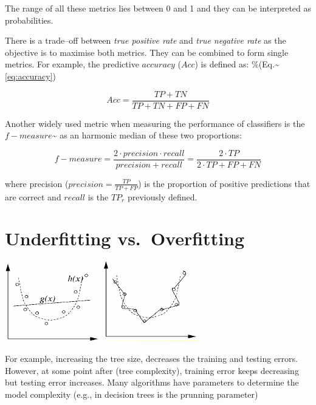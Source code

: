 \documentclass[]{book}
\theoremstyle{definition}
\theoremstyle{definition}
\theoremstyle{remark}
\begin{document}
{The range of all these metrics lies between 0 and 1 and they can be
interpreted as probabilities.

There is a trade--off between \emph{true positive rate} and
\emph{true negative rate} as the objective is to maximise both metrics.
They can be combined to form single metrics. For example, the predictive
\(accuracy\) (\(Acc\)) is defined as:
\%(Eq.\textasciitilde{}\ref{eq:accuracy})

\[
    Acc = \frac{TP + TN}{TP + TN + FP + FN}
\]

Another widely used metric when measuring the performance of classifiers
is the \(f-measure\)\textasciitilde{}\citep{WF05} as an harmonic median
of these two proportions:

\[
    f-measure = \frac{2 \cdot precision \cdot recall}{precision + recall} = \frac{2 \cdot TP}{2 \cdot TP + FP + FN}
\]

where precision (\(precision = \frac{TP}{TP+FP}\)) is the proportion of
positive predictions that are correct and \(recall\) is the \(TP_r\)
previously defined.

\section{Underfitting
vs.~Overfitting}\label{underfitting-vs.overfitting}

\includegraphics{figures/underfitting.png}
\includegraphics{figures/overfitting.png}

For example, increasing the tree size, decreases the training and
testing errors. However, at some point after (tree complexity), training
error keeps decreasing but testing error increases. Many algorithms have
parameters to determine the model complexity (e.g., in decision trees is
the prunning parameter)

}
\end{document}

